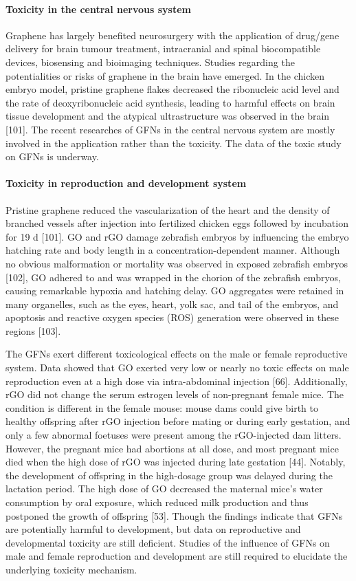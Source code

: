 \documentclass[twoside,twocolumn,9pt]{article}
\begin{document}
\paragraph{Toxicity in the central nervous system} Graphene has largely benefited neurosurgery with the application of drug/gene delivery for brain tumour treatment, intracranial and spinal biocompatible devices, biosensing and bioimaging techniques. Studies regarding the potentialities or risks of graphene in the brain have emerged. In the chicken embryo model, pristine graphene flakes decreased the ribonucleic acid level and the rate of deoxyribonucleic acid synthesis, leading to harmful effects on brain tissue development and the atypical ultrastructure was observed in the brain [101]. The recent researches of GFNs in the central nervous system are mostly involved in the application rather than the toxicity. The data of the toxic study on GFNs is underway.

\paragraph{Toxicity in reproduction and development system} Pristine graphene reduced the vascularization of the heart and the density of branched vessels after injection into fertilized chicken eggs followed by incubation for 19 d [101]. GO and rGO damage zebrafish embryos by influencing the embryo hatching rate and body length in a concentration-dependent manner. Although no obvious malformation or mortality was observed in exposed zebrafish embryos [102], GO adhered to and was wrapped in the chorion of the zebrafish embryos, causing remarkable hypoxia and hatching delay. GO aggregates were retained in many organelles, such as the eyes, heart, yolk sac, and tail of the embryos, and apoptosis and reactive oxygen species (ROS) generation were observed in these regions [103].

The GFNs exert different toxicological effects on the male or female reproductive system. Data showed that GO exerted very low or nearly no toxic effects on male reproduction even at a high dose via intra-abdominal injection [66]. Additionally, rGO did not change the serum estrogen levels of non-pregnant female mice. The condition is different in the female mouse: mouse dams could give birth to healthy offspring after rGO injection before mating or during early gestation, and only a few abnormal foetuses were present among the rGO-injected dam litters. However, the pregnant mice had abortions at all dose, and most pregnant mice died when the high dose of rGO was injected during late gestation [44]. Notably, the development of offspring in the high-dosage group was delayed during the lactation period. The high dose of GO decreased the maternal mice’s water consumption by oral exposure, which reduced milk production and thus postponed the growth of offspring [53]. Though the findings indicate that GFNs are potentially harmful to development, but data on reproductive and developmental toxicity are still deficient. Studies of the influence of GFNs on male and female reproduction and development are still required to elucidate the underlying toxicity mechanism.
\end{document}
